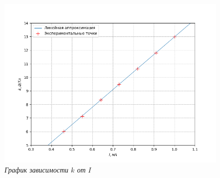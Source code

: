 \documentclass[a4paper,12pt]{article}
\begin{document}
\begin{figure}[h!]
        \centering
	\includegraphics[width=1.1\textwidth]{graph-I-k.png}
	\caption{\textit{График зависимости $k$ от $I$}}
	\label{graph:3}
\end{figure}
\end{document}
